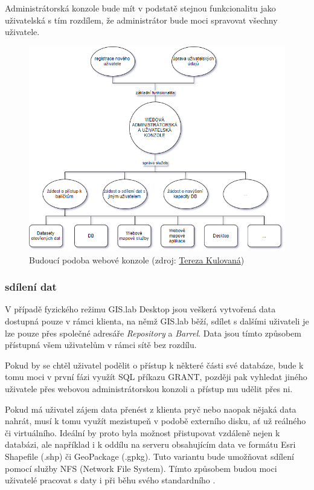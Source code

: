 Administrátorská konzole bude mít v podstatě stejnou funkcionalitu jako uživatelská s tím rozdílem, že administrátor bude moci spravovat všechny uživatele. 

\begin{figure}[H] \centering
    \includegraphics[width=400pt]{./pictures/console_services_02.png}
    \caption[Budoucí podoba webové konzole]{Budoucí podoba webové konzole (zdroj:
	\href{}{Tereza Kulovaná})}
    \label{fig:konzole-sluzby}
\end{figure}

\subsubsection{sdílení dat}
V případě fyzického režimu GIS.lab Desktop jsou veškerá vytvořená data
dostupná pouze v rámci klienta, na němž GIS.lab běží, sdílet s dalšími
uživateli je lze pouze přes společné adresáře \textit{Repository} a
\textit{Barrel}. Data jsou tímto způsobem přístupná všem uživatelům v
rámci sítě bez rozdílu.

Pokud by se chtěl uživatel podělit o přístup k některé části své
databáze, bude k tomu moci v první fázi využít SQL příkazu GRANT,
později pak vyhledat jiného uživatele přes webovou administrátorskou
konzoli a přístup mu udělit přes ni.

Pokud má uživatel zájem data přenést z klienta pryč nebo naopak nějaká
data nahrát, musí k tomu využít mezistupeň v podobě externího disku,
ať už reálného či virtuálního. Ideální by proto byla možnost
přistupovat vzdáleně nejen k databázi, ale například i k oddílu na
serveru obsahujícím data ve formátu Esri Shapefile (.shp) či
GeoPackage (.gpkg). Tuto variantu bude umožňovat sdílení pomocí služby
NFS (Network File System). Tímto způsobem budou moci uživatelé
pracovat s daty i při běhu svého standardního .

